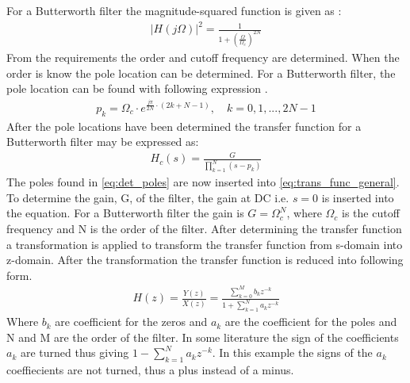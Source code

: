 For a Butterworth filter the magnitude-squared function is given as \citep{Oppenheim}:
\begin{align}
|H(j\Omega)|^2 = \frac{1}{1+(\frac{\Omega}{\Omega_c})^{2N}}
\label{eq:mag_sq}
\end{align}
From the requirements the order and cutoff frequency are determined. When the order is know the pole location can be determined. For a Butterworth filter, the pole location can be found with following expression \citep{Oppenheim}.
\begin{align}
p_k = \Omega_c \cdot e^{\frac{j\pi}{2N}\cdot (2k+N-1)}, \quad k=0,1, ..., 2N-1
\label{eq:det_poles}
\end{align}
After the pole locations have been determined the transfer function for a Butterworth filter may be expressed as:
\begin{align}
H_c(s) = \frac{G}{\prod\limits_{k=1}^{N}(s-p_k)} 
\label{eq:trans_func_general}
\end{align}
The poles found in \autoref{eq:det_poles} are now inserted into \autoref{eq:trans_func_general}. To determine the gain, G, of the filter, the gain at DC i.e. $s=0$ is inserted into the equation. For a Butterworth filter the gain is $G=\Omega_c^N$, where $\Omega_c$ is the cutoff frequency and N is the order of the filter. After determining the transfer function a transformation is applied to transform the transfer function from s-domain into z-domain. After the transformation the transfer function is reduced into following form.
\begin{align}
H(z) = \frac{Y(z)}{X(z)} = \frac{\sum\limits_{k=0}^{M}b_kz^{-k}}{1 + \sum\limits_{k=1}^{N}a_kz^{-k}} 
\label{eq:trans_standard}
\end{align}
Where $b_k$ are coefficient for the zeros and $a_k$ are the coefficient for the poles and N and M are the order of the filter. In some literature the sign of the  coefficients $a_k$ are turned thus giving $1 - \sum\limits_{k=1}^{N}a_kz^{-k}$. In this example the signs of the $a_k$ coeffiecients are not turned, thus a plus instead of a minus.

